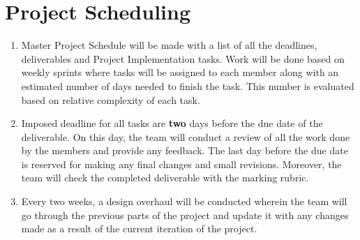 \documentclass[12pt]{article}
\begin{document}
\section{Project Scheduling}

\begin{enumerate}
\item Master Project Schedule will be made with a list of all the deadlines, deliverables and Project Implementation tasks. Work will be done based on weekly sprints where tasks will be assigned to each member along with an estimated number of days needed to finish the task. This number is evaluated based on relative complexity of each task.\\

\item Imposed deadline for all tasks are \textbf{two} days before the due date of the deliverable. On this day, the team will conduct a review of all the work done by the members and provide any feedback. The last day before the due date is reserved for making any final changes and small revisions. Moreover, the team will check the completed deliverable with the marking rubric.\\

\item Every two weeks, a design overhaul will be conducted wherein the team will go through the previous parts of the project and update it with any changes made as a result of the current iteration of the project.\\
\end{enumerate}
\end{document}
